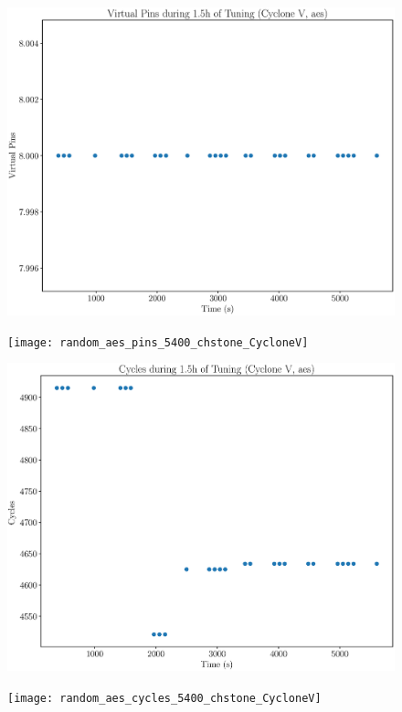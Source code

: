 \documentclass[12pt, a4paper]{article}
\begin{document}
\begin{figure}[htpb]
    \begin{minipage}{.48\textwidth}
        \includegraphics[scale=.25]{aes_pins_5400_chstone_CycloneV}
    \end{minipage}%
    \hfill
    \begin{minipage}{.48\textwidth}
        \texttt{[image: random\_aes\_pins\_5400\_chstone\_CycloneV]}
    \end{minipage}%

    \begin{minipage}{.48\textwidth}
        \includegraphics[scale=.25]{aes_cycles_5400_chstone_CycloneV}
    \end{minipage}%
    \hfill
    \begin{minipage}{.48\textwidth}
        \texttt{[image: random\_aes\_cycles\_5400\_chstone\_CycloneV]}
    \end{minipage}%
\end{figure}
\end{document}
